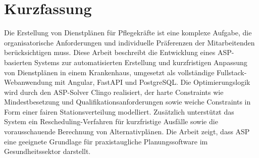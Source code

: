 
\chapter*{Kurzfassung}

Die Erstellung von Dienstplänen für Pflegekräfte ist eine komplexe Aufgabe, die organisatorische Anforderungen und individuelle Präferenzen der Mitarbeitenden berücksichtigen muss. Diese Arbeit beschreibt die Entwicklung eines ASP-basierten Systems zur automatisierten Erstellung und kurzfristigen Anpassung von Dienstplänen in einem Krankenhaus, umgesetzt als vollständige Fullstack-Webanwendung mit Angular, FastAPI und PostgreSQL.
Die Optimierungslogik wird durch den ASP-Solver Clingo realisiert, der harte Constraints wie Mindestbesetzung und Qualifikationsanforderungen sowie weiche Constraints in Form einer fairen Stationsverteilung modelliert. Zusätzlich unterstützt das System ein Rescheduling-Verfahren für kurzfristige Ausfälle sowie die vorausschauende Berechnung von Alternativplänen. Die Arbeit zeigt, dass ASP eine geeignete Grundlage für praxistaugliche Planungssoftware im Gesundheitssektor darstellt.